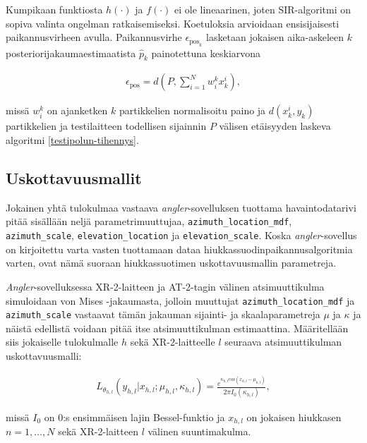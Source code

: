 \documentclass[
  12pt,
  a4paper, twoside]{book}
\begin{document}
Kumpikaan funktiosta \(h(\cdot)\) ja \(f(\cdot)\) ei ole lineaarinen, joten SIR-algoritmi on sopiva valinta ongelman ratkaisemiseksi. Koetuloksia arvioidaan ensisijaisesti paikannusvirheen avulla. Paikannusvirhe \(\epsilon_{\text{pos}_k}\) lasketaan jokaisen aika-askeleen \(k\) posteriorijakaumaestimaatista \(\hat{p}_k\) painotettuna keskiarvona

\begin{align}
\epsilon_{\text{pos}} = d(P, \sum_{i=1}^Nw^k_ix^i_k),
\end{align}

\noindent missä \(w_i^k\) on ajanketken \(k\) partikkelien normalisoitu paino ja \(d(x^i_k,y_k)\) partikkelien ja testilaitteen todellisen sijainnin \(P\) välisen etäisyyden laskeva algoritmi \ref{testipolun-tihennys}.

\hypertarget{uskottavuusmallit}{%
\subsection{Uskottavuusmallit}\label{uskottavuusmallit}}

Jokainen yhtä tulokulmaa vastaava \emph{angler}-sovelluksen tuottama havaintodatarivi pitää sisällään neljä parametrimuuttujaa, \texttt{azimuth\_location\_mdf}, \texttt{azimuth\_scale}, \texttt{elevation\_location} ja \texttt{elevation\_scale}. Koska \emph{angler}-sovellus on kirjoitettu varta vasten tuottamaan dataa hiukkassuodinpaikannusalgoritmia varten, ovat nämä suoraan hiukkassuotimen uskottavuusmallin parametreja.

\emph{Angler}-sovelluksessa XR-2-laitteen ja AT-2-tagin välinen atsimuuttikulma simuloidaan von Mises -jakaumasta, jolloin muuttujat \texttt{azimuth\_location\_mdf} ja \texttt{azimuth\_scale} vastaavat tämän jakauman sijainti- ja skaalaparametreja \(\mu\) ja \(\kappa\) ja näistä edellistä voidaan pitää itse atsimuuttikulman estimaattina. Määritellään siis jokaiselle tulokulmalle \(h\) sekä XR-2-laitteelle \(l\) seuraava atsimuuttikulman uskottavuusmalli:

\begin{align}\label{atsimuutti-uskottavuusmalli}
L_{\theta_{h,l}}(y_{h,l}|x_{h,l}; \mu_{h,l}, \kappa_{h,l})=\frac{e^{\kappa_{h,l} \text{cos}(x_{h,l}-\mu_{h,l})}}{2 \pi I_0(\kappa_{h,l})},
\end{align}

missä \(I_0\) on 0:s ensimmäisen lajin Bessel-funktio ja \(x_{h,l}\) on jokaisen hiukkasen \(n=1,\ldots,N\) sekä XR-2-laitteen \(l\) välinen suuntimakulma.
\end{document}
